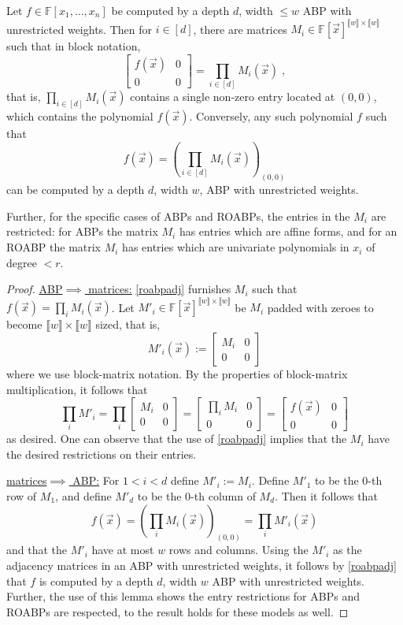 \documentclass[letterpaper,11pt]{article}
\numberwithin{equation}{section}
\theoremstyle{plain}
\theoremstyle{remark}
\newcommand{\zr}[1]{{\llbracket {#1}\rrbracket}}
\newcommand{\F}{\mathbb{F}}
\newcommand{\eqdef}{:=}
\begin{document}
\begin{lemma}
	\label{roabpmatrix}
	Let $f\in\F[x_1,\ldots,x_n]$ be computed by a depth $d$, width $\le w$ ABP with unrestricted weights.  Then for $i\in[d]$, there are matrices $M_i\in\F[\vec{x}]^{\zr{w}\times\zr{w}}$ such that in block notation,
	\[	
		\begin{bmatrix}
			f(\vec{x})&0\\
			0&0
		\end{bmatrix}
		=\prod_{i\in[d]}M_i(\vec{x})\;,
	\]
	that is, $\prod_{i\in[d]}M_i(\vec{x})$ contains a single non-zero entry located at $(0,0)$, which contains the polynomial $f(\vec{x})$.  Conversely, any such polynomial $f$ such that
	\[
		f(\vec{x})=\left(\prod_{i\in[d]}M_i(\vec{x})\right)_{(0,0)}
	\]
	can be computed by a depth $d$, width $w$, ABP with unrestricted weights.

	Further, for the specific cases of ABPs and ROABPs, the entries in the $M_i$ are restricted: for ABPs the matrix $M_i$ has entries which are affine forms, and for an ROABP the matrix $M_i$ has entries which are univariate polynomials in $x_i$ of degree $<r$.
\end{lemma}
\begin{proof}
	\uline{ABP$\implies$ matrices:} \autoref{roabpadj} furnishes $M_i$ such that $f(\vec{x})=\prod_i M_i(\vec{x})$.  Let $M'_i\in\F[\vec{x}]^{\zr{w}\times\zr{w}}$ be $M_i$ padded with zeroes to become $\zr{w}\times\zr{w}$ sized, that is,
	\[M'_i(\vec{x})\eqdef
		\begin{bmatrix}
			M_i&0\\
			0&0
		\end{bmatrix}
	\]
	where we use block-matrix notation.  By the properties of block-matrix multiplication, it follows that
	\[
		\prod_i M'_i=
		\prod_i
		\begin{bmatrix}
			M_i&0\\
			0&0
		\end{bmatrix}
		=
		\begin{bmatrix}
			\prod_iM_i&0\\
			0&0
		\end{bmatrix}
		=
		\begin{bmatrix}
			f(\vec{x})&0\\
			0&0
		\end{bmatrix}
	\]
	as desired. One can observe that the use of \autoref{roabpadj} implies that the $M_i$ have the desired restrictions on their entries.

	\uline{matrices$\implies$ ABP:} For $1<i<d$ define $M'_i\eqdef M_i$.  Define $M'_1$ to be the $0$-th row of $M_1$, and define $M'_d$ to be the $0$-th column of $M_d$.  Then it follows that \[f(\vec{x})=\left(\prod_i M_i(\vec{x})\right)_{(0,0)}=\prod_i M'_i(\vec{x})\]
	and that the $M'_i$ have at most $w$ rows and columns. Using the $M'_i$ as the adjacency matrices in an ABP with unrestricted weights, it follows by \autoref{roabpadj} that $f$ is computed by a depth $d$, width $w$ ABP with unrestricted weights.  Further, the use of this lemma shows the entry restrictions for ABPs and ROABPs are respected, to the result holds for these models as well.
\end{proof}
\end{document}
